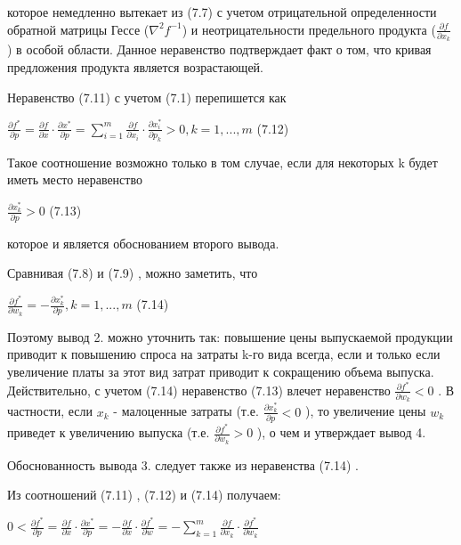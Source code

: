 \documentclass[12pt, 4paper]{book}
\begin{document}
{которое немедленно вытекает из (7.7) с учетом отрицательной определенности обратной матрицы Гессе ($\nabla^2 f^{-1}$) и неотрицательности предельного продукта ($\frac{\partial f}{\partial x_k}$) в особой области. Данное неравенство подтверждает факт о том, что кривая предложения продукта является возрастающей. 
\par

Неравенство (7.11) с учетом (7.1) перепишется как 
\begin{center}
$\frac{\partial f^{*}}{\partial p}=\frac{\partial f}{\partial x} \cdot \frac{\partial x^{*}}{\partial p}=\sum\limits_{i=1}^{m}\frac{\partial f}{\partial x_i} \cdot \frac{\partial x_{i}^{*}}{\partial p_k}> 0 ,k=1,...,m$ (7.12)
\end{center}
\par

Такое соотношение возможно только в том случае, если для некоторых k будет иметь место неравенство 
\begin{center}
$\frac{\partial x_{k}^{*}}{\partial p}> 0$ (7.13)
\end{center}
\par

которое и является обоснованием второго вывода. 
\par

Сравнивая (7.8) и (7.9) , можно заметить, что 
\begin{center}
$\frac{\partial f^{*}}{\partial w_k}= -\frac{\partial x_{k}^{*}}{\partial p}, k=1,...,m$ (7.14)
\end{center}
\par

Поэтому вывод 2. можно уточнить так: повышение цены выпускаемой продукции приводит к повышению спроса на затраты k-го вида всегда, если и только если увеличение платы за этот вид затрат приводит к сокращению объема выпуска. Действительно, с учетом (7.14) неравенство (7.13) влечет неравенство $\frac{\partial f^{*}}{\partial w_k}<0 $ . В частности, если $x_k$ - малоценные затраты (т.е. $\frac{\partial x_{k}^{*}}{\partial p}< 0$ ), то увеличение цены $w_k$ приведет к увеличению выпуска (т.е. $\frac{\partial f^{*}}{\partial w_k}>0$ ), о чем и утверждает вывод 4. 
\par

Обоснованность вывода 3. следует также из неравенства (7.14) . 
\par

Из соотношений (7.11) , (7.12) и (7.14) получаем: 
\begin{center}
$0< \frac{\partial f^{*}}{\partial p} = \frac{\partial f}{\partial x}\cdot \frac{\partial x^{*}}{\partial p}= - \frac{\partial f}{\partial x}\cdot \frac{\partial f^{*}}{\partial w}= -\sum\limits_{k=1}^{m}\frac{\partial f}{\partial x_k}\cdot \frac{\partial f^{*}}{\partial w_k}$
\end{center}
\par

}
\end{document}
